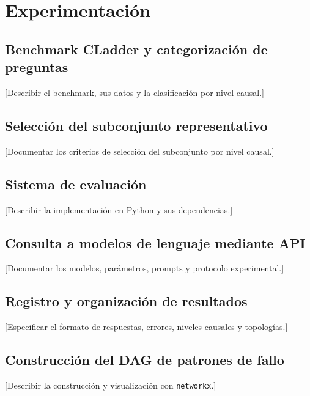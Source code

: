 \chapter{Experimentación}

\section{Benchmark CLadder y categorización de preguntas}
[Describir el benchmark, sus datos y la clasificación por nivel causal.]

\section{Selección del subconjunto representativo}
[Documentar los criterios de selección del subconjunto por nivel causal.]

\section{Sistema de evaluación}
[Describir la implementación en Python y sus dependencias.]

\section{Consulta a modelos de lenguaje mediante API}
[Documentar los modelos, parámetros, prompts y protocolo experimental.]

\section{Registro y organización de resultados}
[Especificar el formato de respuestas, errores, niveles causales y topologías.]

\section{Construcción del DAG de patrones de fallo}
[Describir la construcción y visualización con \texttt{networkx}.]
